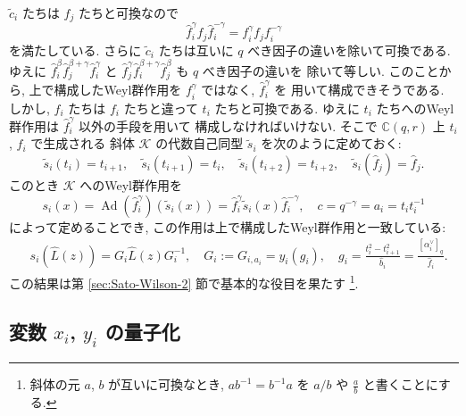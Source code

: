 \documentclass[12pt,twoside,dvipdfm]{msjproc}
\newcommand\C{{\mathbb C}} %
\theoremstyle{definition} %
\theoremstyle{definition} %
\theoremstyle{definition} %
\numberwithin{theorem}{section}
\numberwithin{equation}{section}
\numberwithin{figure}{section}
\numberwithin{table}{section}
\newcommand\secref[1]{第 \ref{#1} 節}
\newcommand\K{\mathcal{K}}
\newcommand\Ad{\mathop{\mathrm{Ad}}\nolimits}
\newcommand\tc{{\tilde{c}}}
\newcommand\ts{{\tilde{s}}}
\newcommand\hL{{\widehat{L}}}
\newcommand\hb{{\hat{b}}}
\newcommand\hf{{\hat{f}}}
\newcommand\av{\alpha^\vee}
\begin{document}
$\tc_i$ たちは $f_j$ たちと可換なので
\begin{equation*}
 \hf_i^\gamma f_j \hf_i^{-\gamma} = f_i^\gamma f_j f_i^{-\gamma}
\end{equation*}
を満たしている.  さらに $\tc_i$ たちは互いに $q$ べき因子の違いを除いて可換である.
ゆえに $\hf_i^\beta \hf_j^{\beta+\gamma} \hf_i^\gamma$ と
$\hf_j^\gamma \hf_i^{\beta+\gamma} \hf_j^\beta$ も $q$ べき因子の違いを
除いて等しい. このことから, 
上で構成したWeyl群作用を $f_i^\gamma$ ではなく, $\hf_i^\gamma$ を
用いて構成できそうである. 
しかし, $\hf_i$ たちは $f_i$ たちと違って $t_i$ たちと可換である.
ゆえに $t_i$ たちへのWeyl群作用は $\hf_i^\gamma$ 以外の手段を用いて
構成しなければいけない. そこで $\C(q,r)$ 上 $t_i$, $\hf_i$ で生成される
斜体 $\K$ の代数自己同型 $\ts_i$ を次のように定めておく:
\begin{equation*}
 \ts_i(t_i)=t_{i+1}, \quad
 \ts_i(t_{i+1})=t_i, \quad
 \ts_i(t_{i+2})=t_{i+2}, \quad
 \ts_i(\hf_j)=\hf_j.
\end{equation*} 
このとき $\K$ へのWeyl群作用を
\begin{equation*}
  s_i(x) = \Ad(\hf_i^\gamma)(\ts_i(x)) = \hf_i^\gamma\ts_i(x)\hf_i^{-\gamma}, \quad
  c = q^{-\gamma} = a_i = t_i t_i^{-1}
\end{equation*}
によって定めることでき, この作用は上で構成したWeyl群作用と一致している:
\begin{align*}
 &
 s_i(\hL(z)) = G_i \hL(z) G_i^{-1}, \quad
 G_i := G_{i,a_i} = y_i(g_i), \quad
 g_i = \frac{t_i^2-t_{i+1}^2}{\hb_i} = \frac{[\av_i]_q}{\hf_i}.
\end{align*}
この結果は\secref{sec:Sato-Wilson-2}で基本的な役目を果たす%
\footnote{斜体の元 $a$, $b$ が互いに可換なとき, 
$ab^{-1}=b^{-1}a$ を $a/b$ や $\frac{a}{b}$ と書くことにする.}.



\subsection{変数 $x_i$, $y_i$ の量子化}
\label{sec:xy}
\end{document}
